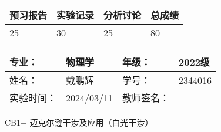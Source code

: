 \documentclass[dvipsnames, svgnames,a4paper,11pt]{article}
\begin{document}
\begin{table}
	\renewcommand\arraystretch{1.7}
	\begin{tabularx}{\textwidth}{
		|X|X|X|X
		|X|X|X|X|}
	\hline
	\multicolumn{2}{|c|}{预习报告}&\multicolumn{2}{|c|}{实验记录}&\multicolumn{2}{|c|}{分析讨论}&\multicolumn{2}{|c|}{总成绩}\\
	\hline
	\LARGE25 & & \LARGE30 & & \LARGE25 & & \LARGE80 & \\
	\hline
	\end{tabularx}
\end{table}


\begin{table}
	\renewcommand\arraystretch{1.7}
	\begin{tabularx}{\textwidth}{|X|X|X|X|}
	\hline
	专业：& 物理学 &年级：& 2022级\\
	\hline
	姓名：& 戴鹏辉  & 学号： & 2344016 \\
	\hline
	实验时间：& 2024/03/11 & 教师签名：& \\
	\hline
	\end{tabularx}
\end{table}

\begin{center}
	\LARGE CB1+ \quad 迈克尔逊干涉及应用（白光干涉） 
\end{center}
\end{document}
